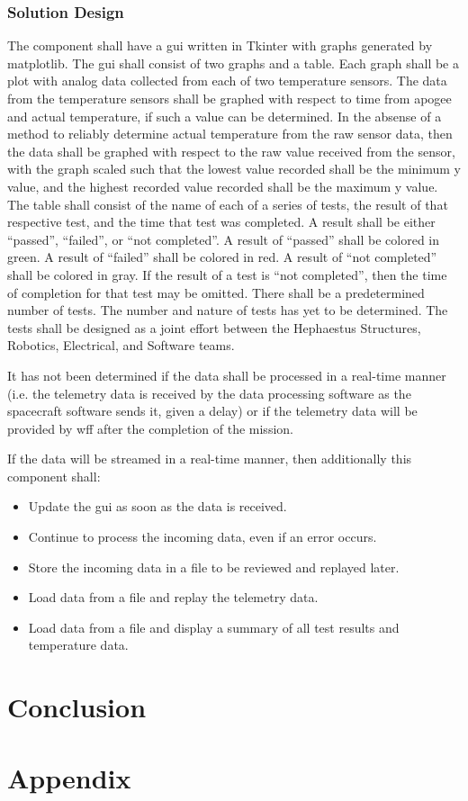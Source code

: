 \documentclass[letterpaper,10pt]{article}
\begin{document}
\subsubsection{Solution Design}
The component shall have a \gls{gui} written in Tkinter with graphs generated by
\gls{matplotlib}.
The \gls{gui} shall consist of two graphs and a table.
Each graph shall be a \gls{plot} with analog data collected from each of two temperature sensors.
The data from the temperature sensors shall be graphed with respect to time from
\gls{apogee} and actual temperature, if such a value can be determined.
In the absense of a method to reliably determine actual temperature from the raw
sensor data, then the data shall be graphed with respect to the raw value received
from the sensor, with the graph scaled such that the lowest value recorded shall be
the minimum y value, and the highest recorded value recorded shall be the maximum y value.
The table shall consist of the name of each of a series of tests,
the result of that respective test, and the time that test was completed.
A result shall be either ``passed'', ``failed'', or ``not completed''.
A result of ``passed'' shall be colored in green.
A result of ``failed'' shall be colored in red.
A result of ``not completed'' shall be colored in gray.
If the result of a test is ``not completed'', then the time of completion for that test
may be omitted.
There shall be a predetermined number of tests.
The number and nature of tests has yet to be determined.
The tests shall be designed as a joint effort between the Hephaestus Structures,
Robotics, Electrical, and Software teams.

It has not been determined if the data shall be processed in a real-time manner
(i.e. the telemetry data is received by the data processing software as the
spacecraft software sends it, given a delay) or if the telemetry data will be provided
by \gls{wff} after the completion of the mission.

If the data will be streamed in a real-time manner, then additionally this component shall:
\begin{itemize}
\item Update the \gls{gui} as soon as the data is received.
\item Continue to process the incoming data, even if an error occurs.
\item Store the incoming data in a file to be reviewed and \gls{replay}ed later.
\item Load data from a file and \gls{replay} the telemetry data.
\item Load data from a file and display a summary of all test results and
temperature data.
\end{itemize}

\section{Conclusion}
\printglossary[numberedsection]

\section{Appendix}

\end{document}
